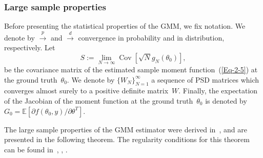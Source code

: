 \documentclass{article}
\newcommand{\E}[0]{\mathbb{E}}
\newcommand{\Cov}[0]{\operatorname{Cov}}
\begin{document}
\subsubsection{Large sample properties}
\label{gmm:large}
Before presenting the statistical properties of the GMM, we fix notation. We denote by $\overset{p}{\to}$ and $\overset{d}{\to}$ convergence in  probability and in distribution, respectively. Let
\begin{equation} \label{eqn:cov_mat_S}
	S := \lim_{N\to \infty}\Cov\left[\sqrt{N}g_N(\theta_0)\right],
\end{equation}
be the covariance matrix of the estimated sample moment function~(\ref{Eq-2-5}) at the ground truth~$\theta_0$. We denote by $\{W_N\}_{N=1}^\infty$ a sequence of PSD matrices which converges almost surely to a positive definite matrix~$W$. Finally, the expectation of the Jacobian of the moment function at the ground truth~$\theta_0$ is denoted by $G_0 = \E\left[\partial f(\theta_0, y) / \partial \theta^T\right]$.

The large sample properties of the GMM estimator were derived in~\cite{Hansen1982}, and are presented in the following theorem. The regularity conditions for this theorem can be found in~\cite{Hansen1982}, \cite{Hall2005}, \cite{abas2021generalized}.
\end{document}
